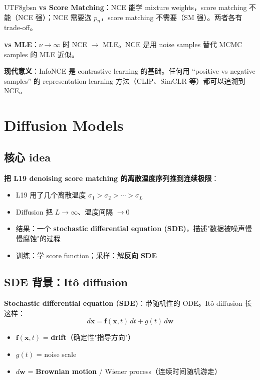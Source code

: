 \documentclass[11pt]{article}
\begin{document}
\begin{CJK}{UTF8}{gbsn}
\textbf{vs Score Matching}：NCE 能学 mixture weights，score matching 不能（NCE 强）；NCE 需要选 $p_n$，score matching 不需要（SM 强）。两者各有 trade-off。

\textbf{vs MLE}：$\nu \to \infty$ 时 NCE $\to$ MLE。NCE 是用 noise samples 替代 MCMC samples 的 MLE 近似。

\textbf{现代意义}：InfoNCE 是 contrastive learning 的基础。任何用 ``positive vs negative samples'' 的 representation learning 方法（CLIP、SimCLR 等）都可以追溯到 NCE。

\section{Diffusion Models}

\subsection{核心 idea}

\textbf{把 L19 denoising score matching 的离散温度序列推到连续极限}：
\begin{itemize}[nosep]
  \item L19 用了几个离散温度 $\sigma_1 > \sigma_2 > \cdots > \sigma_L$
  \item Diffusion 把 $L \to \infty$、温度间隔 $\to 0$
  \item 结果：一个 \textbf{stochastic differential equation (SDE)}，描述"数据被噪声慢慢腐蚀"的过程
  \item 训练：学 score function；采样：解\textbf{反向 SDE}
\end{itemize}

\subsection{SDE 背景：Itô diffusion}

\textbf{Stochastic differential equation (SDE)}：带随机性的 ODE。Itô diffusion 长这样：
\[
d\mathbf{x} = \mathbf{f}(\mathbf{x}, t) \, dt + g(t) \, d\mathbf{w}
\]
\begin{itemize}[nosep]
  \item $\mathbf{f}(\mathbf{x}, t)$ = \textbf{drift}（确定性"指导方向"）
  \item $g(t)$ = noise scale
  \item $d\mathbf{w}$ = \textbf{Brownian motion} / Wiener process（连续时间随机游走）
\end{itemize}


\end{CJK}
\end{document}
